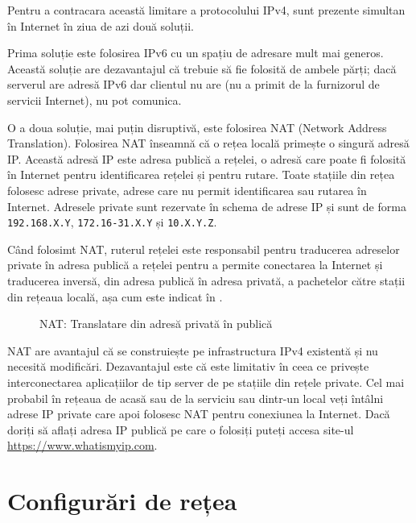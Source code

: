 Pentru a contracara această limitare a protocolului IPv4, sunt prezente simultan în Internet în ziua de azi două soluții.

Prima soluție este folosirea IPv6 cu un spațiu de adresare mult mai generos. Această soluție are dezavantajul că trebuie să fie folosită de ambele părți; dacă serverul are adresă IPv6 dar clientul nu are (nu a primit de la furnizorul de servicii Internet), nu pot comunica.

O a doua soluție, mai puțin disruptivă, este folosirea NAT (Network Address Translation). Folosirea NAT înseamnă că o rețea locală primește o singură adresă IP. Această adresă IP este adresa publică a rețelei, o adresă care poate fi folosită în Internet pentru identificarea rețelei și pentru rutare. Toate stațiile din rețea folosesc adrese private, adrese care nu permit identificarea sau rutarea în Internet. Adresele private sunt rezervate în schema de adrese IP și sunt de forma \texttt{192.168.X.Y}, \texttt{172.16-31.X.Y} și \texttt{10.X.Y.Z}.

Când folosimt NAT, ruterul rețelei este responsabil pentru traducerea adreselor private în adresa publică a rețelei pentru a permite conectarea la Internet și traducerea inversă, din adresa publică în adresa privată, a pachetelor către stații din rețeaua locală, așa cum este indicat în .

\begin{figure}[htbp]
  \centering
  \def\svgwidth{\columnwidth}
  
  \caption{NAT: Translatare din adresă privată în publică}
  \label{fig:net:nat}
\end{figure}

NAT are avantajul că se construiește pe infrastructura IPv4 existentă și nu necesită modificări. Dezavantajul este că este limitativ în ceea ce privește interconectarea aplicațiilor de tip server de pe stațiile din rețele private. Cel mai probabil în rețeaua de acasă sau de la serviciu sau dintr-un local veți întâlni adrese IP private care apoi folosesc NAT pentru conexiunea la Internet. Dacă doriți să aflați adresa IP publică pe care o folosiți puteți accesa site-ul \url{https://www.whatismyip.com}.

\section{Configurări de rețea}
\label{sec:net:config}

